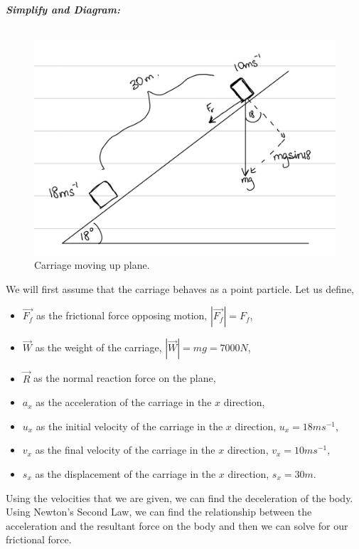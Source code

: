 \begin{subquestions}
\textbf{\textit{Simplify and Diagram:}} \\ \\
\begin{figure}[H]
	\begin{center}
		\includegraphics[scale=0.25]{../2013/figures/2013q5-2}
		\caption{\label{2013:q5:Diagram2} Carriage moving up plane.}
	\end{center}
\end{figure}
We will first assume that the carriage behaves as a point particle. Let us define,
\begin{itemize}
	\item $\vec{F_f}$ as the frictional force opposing motion, $|\vec{F_f}|=F_f$,
	\item $\vec{W}$ as the weight of the carriage, $|\vec{W}|=mg=7000N$,
	\item $\vec{R}$ as the normal reaction force on the plane,
	\item $a_x$ as the acceleration of the carriage in the $x$ direction,
	\item $u_x$ as the initial velocity of the carriage in the $x$ direction, $u_x=18ms^{-1}$,
	\item $v_x$ as the final velocity of the carriage in the $x$ direction, $v_x=10ms^{-1}$,
	\item $s_x$ as the displacement of the carriage in the $x$ direction, $s_x=30m$.
\end{itemize}
Using the velocities that we  are given, we can find the deceleration of the body. Using Newton's Second Law, we can find the relationship between the acceleration and the resultant force on the body and then we can solve for our frictional force.





\end{subquestions}
